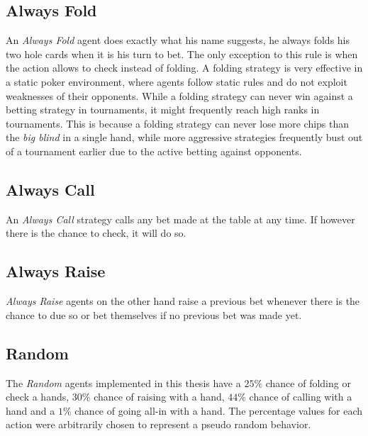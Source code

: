\subsection{Always Fold}
An \textit{Always Fold} agent does exactly what his name suggests, he always folds his two hole cards when it is his turn to bet. The only exception to this rule is when the action allows to check instead of folding. A folding strategy is very effective in a static poker environment, where agents follow static rules and do not exploit weaknesses of their opponents. While a folding strategy can never win against a betting strategy in tournaments, it might frequently reach high ranks in tournaments. This is because a folding strategy can never lose more chips than the \textit{big blind} in a single hand, while more aggressive strategies frequently bust out of a tournament earlier due to the active betting against opponents.
\subsection{Always Call}
An \textit{Always Call} strategy calls any bet made at the table at any time. If however there is the chance to check, it will do so. 
\subsection{Always Raise}
\textit{Always Raise} agents on the other hand raise a previous bet whenever there is the chance to due so or bet themselves if no previous bet was made yet. 
\subsection{Random}
The \textit{Random} agents implemented in this thesis have a $25\%$ chance of folding or check a hands, $30\%$ chance of raising with a hand, $44\%$ chance of calling with a hand and a $1\%$ chance of going all-in with a hand. The percentage values for each action were arbitrarily chosen to represent a pseudo random behavior.

